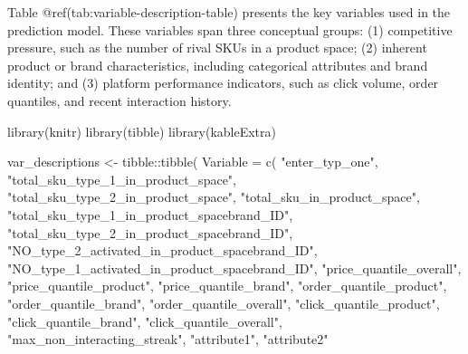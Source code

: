 \documentclass[
  letterpaper,
  DIV=11,
  numbers=noendperiod]{scrartcl}
\newenvironment{Shaded}{\begin{snugshade}}{\end{snugshade}}
\newcommand{\AttributeTok}[1]{\textcolor[rgb]{0.40,0.45,0.13}{#1}}
\newcommand{\FunctionTok}[1]{\textcolor[rgb]{0.28,0.35,0.67}{#1}}
\newcommand{\NormalTok}[1]{\textcolor[rgb]{0.00,0.23,0.31}{#1}}
\newcommand{\OtherTok}[1]{\textcolor[rgb]{0.00,0.23,0.31}{#1}}
\newcommand{\SpecialCharTok}[1]{\textcolor[rgb]{0.37,0.37,0.37}{#1}}
\newcommand{\StringTok}[1]{\textcolor[rgb]{0.13,0.47,0.30}{#1}}
\begin{document}
Table @ref(tab:variable-description-table) presents the key variables
used in the prediction model. These variables span three conceptual
groups: (1) competitive pressure, such as the number of rival SKUs in a
product space; (2) inherent product or brand characteristics, including
categorical attributes and brand identity; and (3) platform performance
indicators, such as click volume, order quantiles, and recent
interaction history.

\begin{Shaded}
\begin{Highlighting}[]
\FunctionTok{library}\NormalTok{(knitr)}
\FunctionTok{library}\NormalTok{(tibble)}
\FunctionTok{library}\NormalTok{(kableExtra)}

\NormalTok{var\_descriptions }\OtherTok{\textless{}{-}}\NormalTok{ tibble}\SpecialCharTok{::}\FunctionTok{tibble}\NormalTok{(}
  \AttributeTok{Variable =} \FunctionTok{c}\NormalTok{(}
    \StringTok{"enter\_typ\_one"}\NormalTok{,}
    \StringTok{"total\_sku\_type\_1\_in\_product\_space"}\NormalTok{,}
    \StringTok{"total\_sku\_type\_2\_in\_product\_space"}\NormalTok{,}
    \StringTok{"total\_sku\_in\_product\_space"}\NormalTok{,}
    \StringTok{"total\_sku\_type\_1\_in\_product\_spacebrand\_ID"}\NormalTok{,}
    \StringTok{"total\_sku\_type\_2\_in\_product\_spacebrand\_ID"}\NormalTok{,}
    \StringTok{"NO\_type\_2\_activated\_in\_product\_spacebrand\_ID"}\NormalTok{,}
    \StringTok{"NO\_type\_1\_activated\_in\_product\_spacebrand\_ID"}\NormalTok{,}
    \StringTok{"price\_quantile\_overall"}\NormalTok{,}
    \StringTok{"price\_quantile\_product"}\NormalTok{,}
    \StringTok{"price\_quantile\_brand"}\NormalTok{,}
    \StringTok{"order\_quantile\_product"}\NormalTok{,}
    \StringTok{"order\_quantile\_brand"}\NormalTok{,}
    \StringTok{"order\_quantile\_overall"}\NormalTok{,}
    \StringTok{"click\_quantile\_product"}\NormalTok{,}
    \StringTok{"click\_quantile\_brand"}\NormalTok{,}
    \StringTok{"click\_quantile\_overall"}\NormalTok{,}
    \StringTok{"max\_non\_interacting\_streak"}\NormalTok{,}
    \StringTok{"attribute1"}\NormalTok{,}
    \StringTok{"attribute2"}
    

\end{Highlighting}
\end{Shaded}
\end{document}
